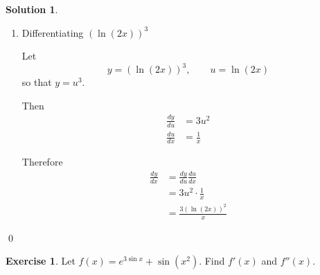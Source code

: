 \documentclass[a4paper]{article}
\theoremstyle{plain}
\theoremstyle{definition}
\newtheorem*{solution}{Solution}
\newtheorem{exercise}{Exercise}
\numberwithin{equation}{subsection}
\begin{document}
\begin{solution}
\begin{enumerate}
    \item Differentiating $(\ln(2x))^3$

    Let
    \[
        y = (\ln(2x))^3, \qquad u = \ln(2x)
    \]
    so that $y = u^3$.

    Then
    \begin{align*}
        \frac{dy}{du} &= 3u^2 \\
        \frac{du}{dx} &= \frac{1}{x}
    \end{align*}

    Therefore
    \begin{align*}
        \frac{dy}{dx} &= \frac{dy}{du}\frac{du}{dx}\\
        &= 3u^2 \cdot \frac{1}{x}\\
        &= \frac{3(\ln(2x))^2}{x}
    \end{align*}
\end{enumerate}
\qed
\end{solution}


\begin{exercise}
Let $f(x)=e^{3\sin x} + \sin(x^2)$. Find $f'(x)$ and $f''(x)$.
\end{exercise}
\end{document}
